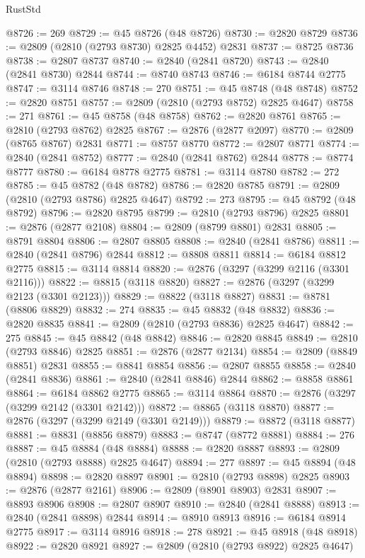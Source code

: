 \begin{lexlean}{RustStd}
\begin{coremodule}
{\begin{coremodule}
{{{{{{{{{{{{{{{{{{{{{{{{{{{{{{{{{@8726 := 269
@8729 := @45 @8726 (@48 @8726)
@8730 := @2820 @8729
@8736 := @2809 (@2810 (@2793 @8730) @2825 @4452) @2831
@8737 := @8725 @8736
@8738 := @2807 @8737
@8740 := @2840 (@2841 @8720)
@8743 := @2840 (@2841 @8730) @2844
@8744 := @8740 @8743
@8746 := @6184 @8744 @2775
@8747 := @3114 @8746
@8748 := 270
@8751 := @45 @8748 (@48 @8748)
@8752 := @2820 @8751
@8757 := @2809 (@2810 (@2793 @8752) @2825 @4647)
@8758 := 271
@8761 := @45 @8758 (@48 @8758)
@8762 := @2820 @8761
@8765 := @2810 (@2793 @8762) @2825
@8767 := @2876 (@2877 @2097)
@8770 := @2809 (@8765 @8767) @2831
@8771 := @8757 @8770
@8772 := @2807 @8771
@8774 := @2840 (@2841 @8752)
@8777 := @2840 (@2841 @8762) @2844
@8778 := @8774 @8777
@8780 := @6184 @8778 @2775
@8781 := @3114 @8780
@8782 := 272
@8785 := @45 @8782 (@48 @8782)
@8786 := @2820 @8785
@8791 := @2809 (@2810 (@2793 @8786) @2825 @4647)
@8792 := 273
@8795 := @45 @8792 (@48 @8792)
@8796 := @2820 @8795
@8799 := @2810 (@2793 @8796) @2825
@8801 := @2876 (@2877 @2108)
@8804 := @2809 (@8799 @8801) @2831
@8805 := @8791 @8804
@8806 := @2807 @8805
@8808 := @2840 (@2841 @8786)
@8811 := @2840 (@2841 @8796) @2844
@8812 := @8808 @8811
@8814 := @6184 @8812 @2775
@8815 := @3114 @8814
@8820 := @2876 (@3297 (@3299 @2116 (@3301 @2116)))
@8822 := @8815 (@3118 @8820)
@8827 := @2876 (@3297 (@3299 @2123 (@3301 @2123)))
@8829 := @8822 (@3118 @8827)
@8831 := @8781 (@8806 @8829)
@8832 := 274
@8835 := @45 @8832 (@48 @8832)
@8836 := @2820 @8835
@8841 := @2809 (@2810 (@2793 @8836) @2825 @4647)
@8842 := 275
@8845 := @45 @8842 (@48 @8842)
@8846 := @2820 @8845
@8849 := @2810 (@2793 @8846) @2825
@8851 := @2876 (@2877 @2134)
@8854 := @2809 (@8849 @8851) @2831
@8855 := @8841 @8854
@8856 := @2807 @8855
@8858 := @2840 (@2841 @8836)
@8861 := @2840 (@2841 @8846) @2844
@8862 := @8858 @8861
@8864 := @6184 @8862 @2775
@8865 := @3114 @8864
@8870 := @2876 (@3297 (@3299 @2142 (@3301 @2142)))
@8872 := @8865 (@3118 @8870)
@8877 := @2876 (@3297 (@3299 @2149 (@3301 @2149)))
@8879 := @8872 (@3118 @8877)
@8881 := @8831 (@8856 @8879)
@8883 := @8747 (@8772 @8881)
@8884 := 276
@8887 := @45 @8884 (@48 @8884)
@8888 := @2820 @8887
@8893 := @2809 (@2810 (@2793 @8888) @2825 @4647)
@8894 := 277
@8897 := @45 @8894 (@48 @8894)
@8898 := @2820 @8897
@8901 := @2810 (@2793 @8898) @2825
@8903 := @2876 (@2877 @2161)
@8906 := @2809 (@8901 @8903) @2831
@8907 := @8893 @8906
@8908 := @2807 @8907
@8910 := @2840 (@2841 @8888)
@8913 := @2840 (@2841 @8898) @2844
@8914 := @8910 @8913
@8916 := @6184 @8914 @2775
@8917 := @3114 @8916
@8918 := 278
@8921 := @45 @8918 (@48 @8918)
@8922 := @2820 @8921
@8927 := @2809 (@2810 (@2793 @8922) @2825 @4647)
}}}}}}}}}}}}}}}}}}}}}}}}}}}}}}}}}
\end{coremodule}}
\end{coremodule}
\end{lexlean}
